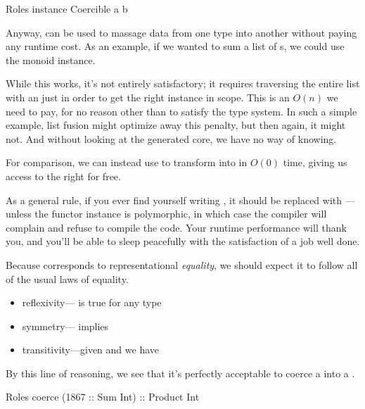 \documentclass[book.tex]{subfiles}
\begin{document}
\begin{dorepl}{Roles}
instance Coercible a b
\end{dorepl}

Anyway,  can be used to massage data from one type into another
without paying any runtime cost. As an example, if we wanted to sum a list
of s, we could use the  monoid instance.


While this works, it's not entirely satisfactory; it requires traversing the
entire list with an  just in order to get the right 
instance in scope. This is an $O(n)$ we need to pay, for no reason other than to
satisfy the type system. In such a simple example, list fusion might optimize
away this penalty, but then again, it might not. And without looking at the
generated core, we have no way of knowing.

For comparison, we can instead use  to transform \ty{[Int]} into
 in $O(0)$ time, giving us access to the right  for
free.


As a general rule, if you ever find yourself writing , it
should be replaced with ---unless the functor instance is
polymorphic, in which case the compiler will complain and refuse to compile the
code. Your runtime performance will thank you, and you'll be able to sleep
peacefully with the satisfaction of a job well done.

Because  corresponds to representational \emph{equality}, we
should expect it to follow all of the usual laws of equality.

\begin{itemize}
  \item{\Gls{reflexivity}--- is true for any type
    }
  \item{\Gls{symmetry}--- implies }
  \item{\Gls{transitivity}---given  and
     we have }
\end{itemize}

By this line of reasoning, we see that it's perfectly acceptable to coerce a
 into a .

\begin{dorepl}{Roles}
coerce (1867 :: Sum Int) :: Product Int
\end{dorepl}
\end{document}
